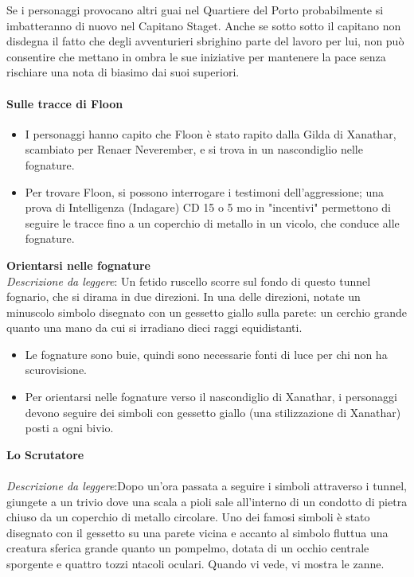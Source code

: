 \documentclass{article}
\begin{document}
Se i personaggi provocano altri guai nel Quartiere del
Porto probabilmente si imbatteranno di nuovo nel Capitano
Staget. Anche se sotto sotto il capitano non disdegna il fatto
che degli avventurieri sbrighino parte del lavoro per lui,
non può consentire che mettano in ombra le sue iniziative
per mantenere la pace senza rischiare una nota di biasimo
dai suoi superiori.
 
\paragraph{Sulle tracce di Floon}
\begin{itemize}
    \item I personaggi hanno capito che Floon è stato rapito dalla Gilda di Xanathar, scambiato per Renaer Neverember, e si trova in un nascondiglio nelle fognature.
    \item Per trovare Floon, si possono interrogare i testimoni dell'aggressione; una prova di Intelligenza (Indagare) CD 15 o 5 mo in "incentivi" permettono di seguire le tracce fino a un coperchio di metallo in un vicolo, che conduce alle fognature.
\end{itemize}
\textbf{Orientarsi nelle fognature}\\
\textit{Descrizione da leggere}: Un fetido ruscello scorre sul fondo di questo tunnel
fognario, che si dirama in due direzioni. In una delle
direzioni, notate un minuscolo simbolo disegnato con
un gessetto giallo sulla parete: un cerchio grande quanto
una mano da cui si irradiano dieci raggi equidistanti.
\begin{itemize} 
    \item Le fognature sono buie, quindi sono necessarie fonti di luce per chi non ha scurovisione.
    \item Per orientarsi nelle fognature verso il nascondiglio di Xanathar, i personaggi devono seguire dei simboli con gessetto giallo (una stilizzazione di Xanathar) posti a ogni bivio.
\end{itemize}

\textbf{Lo Scrutatore}\\
\\
\textit{Descrizione da leggere}:Dopo un'ora passata a seguire i simboli attraverso
i tunnel, giungete a un trivio dove una scala a pioli
sale all'interno di un condotto di pietra chiuso da un
coperchio di metallo circolare. Uno dei famosi simboli
è stato disegnato con il gessetto su una parete vicina e
accanto al simbolo fluttua una creatura sferica grande
quanto un pompelmo, dotata di un occhio centrale
sporgente e quattro tozzi ntacoli oculari. Quando vi
vede, vi mostra le zanne.
\end{document}
